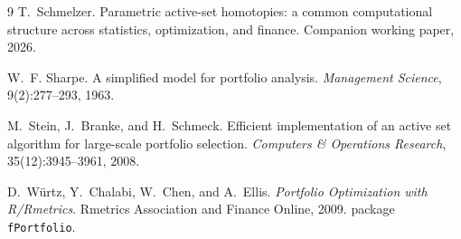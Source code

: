 \documentclass[11pt]{article}
\begin{document}
\begin{thebibliography}{9}
T.~Schmelzer.
\newblock Parametric active-set homotopies: a common computational structure across
statistics, optimization, and finance.
\newblock Companion working paper, 2026.

W.~F. Sharpe.
\newblock A simplified model for portfolio analysis.
\newblock \emph{Management Science}, 9(2):277--293, 1963.

M.~Stein, J.~Branke, and H.~Schmeck.
\newblock Efficient implementation of an active set algorithm for large-scale
portfolio selection.
\newblock \emph{Computers \& Operations Research}, 35(12):3945--3961, 2008.

D.~W\"urtz, Y.~Chalabi, W.~Chen, and A.~Ellis.
\newblock \emph{Portfolio Optimization with R/Rmetrics}.
\newblock Rmetrics Association and Finance Online, 2009.
 package \texttt{fPortfolio}.

\end{thebibliography}
\end{document}
